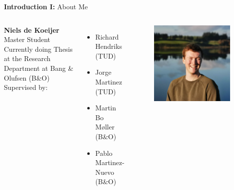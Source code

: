 \documentclass[aspectratio=169]{beamer}
\begin{document}
\begin{frame}{\textbf{Introduction I:} About Me} 
    \begin{columns}[c]
        \textbf{Niels de Koeijer}\\
        Master Student Currently doing Thesis at the Research Department at Bang \& Olufsen (B\&O)\\
        \vspace{0.60cm}
        Supervised by: 
        \begin{itemize}
            \item Richard Hendriks (TUD)
            \item Jorge Martinez (TUD)
            \item Martin Bo M\o ller (B\&O)
            \item Pablo Martinez-Nuevo (B\&O)
        \end{itemize}
        \begin{figure}
            \vspace{-0.8cm}
            \centering
            \includegraphics[scale=0.17]{me.jpg}
        \end{figure}
    \end{columns}
\end{frame}
\end{document}
